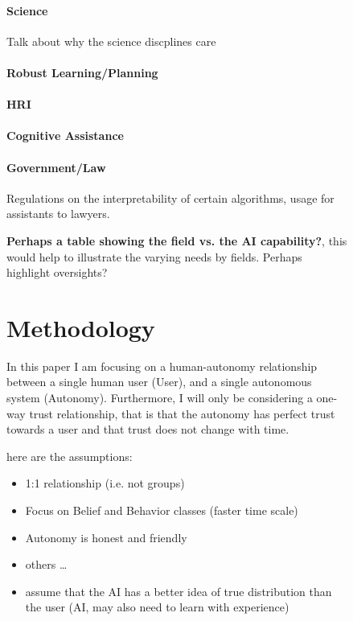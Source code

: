 \begin{figure}[htbp]
    \paragraph{Science} Talk about why the science discplines care
    \paragraph{Robust Learning/Planning}
    \paragraph{HRI}
    \paragraph{Cognitive Assistance} 
    \paragraph{Government/Law} Regulations on the interpretability of certain algorithms, usage for assistants to lawyers.

    \textbf{Perhaps a table showing the field vs. the AI capability?}, this would help to illustrate the varying needs by fields. Perhaps highlight oversights?

\section{Methodology}
    In this paper I am focusing on a human-autonomy relationship between a single human user (User), and a single autonomous system (Autonomy). Furthermore, I will only be considering a one-way trust relationship, that is that the autonomy has perfect trust towards a user and that trust does not change with time. 

    here are the assumptions:

    \begin{itemize}
        \item 1:1 relationship (i.e. not groups)
        \item Focus on Belief and Behavior classes (faster time scale)
        \item Autonomy is honest and friendly
        \item others \ldots
        \item assume that the AI has a better idea of true distribution than the user (AI, may also need to learn with experience)
    \end{itemize}



\end{figure}
